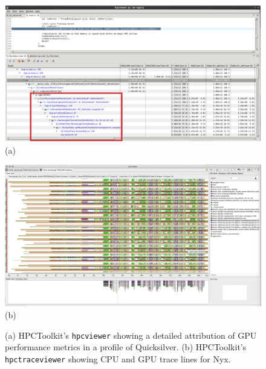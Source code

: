 \begin{figure}[t]
\captionsetup{width=.96\textwidth}
\begin{minipage}[t]{.48\textwidth}
\centering
\includegraphics[width=\textwidth]{projects/2.3.2-Tools/2.3.2.08-HPCToolkit/hpctoolkit-qs}
\\(a)
\end{minipage}
\hfill
\begin{minipage}[t]{.46\textwidth}
\centering
\includegraphics[width=\textwidth]{projects/2.3.2-Tools/2.3.2.08-HPCToolkit/hpctoolkit-nyx-trace}
\\(b)
\end{minipage}
\caption{(a) 
HPCToolkit's {\tt hpcviewer} showing a detailed attribution of GPU performance metrics in a 
profile of Quicksilver.
(b) HPCToolkit's {\tt hpctraceviewer} showing CPU and GPU trace lines for Nyx.}
\label{fig:hpctoolkit}
\end{figure}

